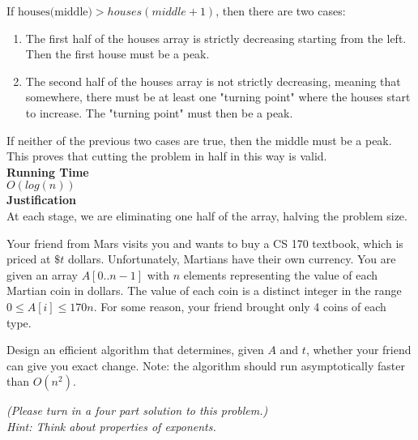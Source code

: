 \begin{qunlist}
{\begin{enumerate}
\end{enumerate}
If $\text{houses(middle)}>houses(middle+1)$, then there are two cases:
\begin{enumerate}
	\item The first half of the houses array is strictly decreasing starting from the left. Then the first house must be a peak. 
	\item The second half of the houses array is not strictly decreasing, meaning that somewhere, there must be at least one "turning point" where the houses start to increase. The "turning point" must then be a peak.
\end{enumerate}
If neither of the previous two cases are true, then the middle must be a peak. This proves that cutting the problem in half in this way is valid. \\
\textbf{Running Time}\\
$O(log(n))$\\
\textbf{Justification}\\
At each stage, we are eliminating one half of the array, halving the problem size.
}
 

\pagebreak


Your friend from Mars visits you and wants to buy a CS 170 textbook, which is priced at $\$t$ dollars. Unfortunately, Martians have their own currency. You are given an array $A[0..n-1]$ with $n$ elements representing the value of each Martian coin in dollars. The value of each coin is a distinct integer in the range $0 \le A[i] \le 170n$. For some reason, your friend brought only 4 coins of each type. 

Design an efficient algorithm that determines, given $A$ and $t$, whether your friend can give you exact change. Note: the algorithm should run asymptotically faster than $O(n^2)$.

\textit{(Please turn in a four part solution to this problem.)}\\
\textit{Hint: Think about properties of exponents.}\\





\end{qunlist}
